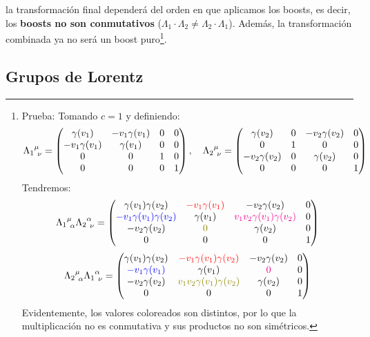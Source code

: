 \documentclass[]{article}
\numberwithin{equation}{section}
\begin{document}
la transformación final dependerá del orden en que aplicamos los boosts, es decir, los \textbf{boosts no son conmutativos} (\(\Lambda_1\cdot\Lambda_2\neq\Lambda_2\cdot\Lambda_1\)). Además, la transformación combinada ya no será un boost puro\footnote{Prueba: Tomando \(c=1\) y definiendo: \[\indUpDown[\Lambda_1] = \begin{pmatrix}
	\gamma(v_1) & -v_1\gamma(v_1) & 0 & 0\\
	-v_1\gamma(v_1) & \gamma(v_1) & 0 & 0\\
	0 & 0 & 1 & 0\\
	0 & 0 & 0 & 1
\end{pmatrix},\ \ \ \indUpDown[\Lambda_2] = \begin{pmatrix}
\gamma(v_2) & 0 & -v_2\gamma(v_2) & 0\\
0 & 1 & 0 & 0\\
-v_2\gamma(v_2) & 0 & \gamma(v_2) & 0\\
0 & 0 & 0 & 1
\end{pmatrix}\] Tendremos: \[\indUpDown[\Lambda_1][\mu][\alpha]\indUpDown[\Lambda_2][\alpha]= \begin{pmatrix}
\gamma(v_1)\gamma(v_2) & \textcolor{red}{-v_1\gamma(v_1)} & -v_2\gamma(v_2) & 0\\
\textcolor{blue}{-v_1\gamma(v_1)\gamma(v_2)} & \gamma(v_1) & \textcolor{magenta}{v_1v_2\gamma(v_1)\gamma(v_2)} & 0\\
-v_2\gamma(v_2) & \textcolor{olive}{0} & \gamma(v_2) & 0\\
0 & 0 & 0 & 1
\end{pmatrix}\]\[\indUpDown[\Lambda_2][\mu][\alpha]\indUpDown[\Lambda_1][\alpha]= \begin{pmatrix}
\gamma(v_1)\gamma(v_2) & \textcolor{red}{-v_1\gamma(v_1)\gamma(v_2)} & -v_2\gamma(v_2) & 0\\
\textcolor{blue}{-v_1\gamma(v_1)} & \gamma(v_1) & \textcolor{magenta}{0} & 0\\
-v_2\gamma(v_2) & \textcolor{olive}{v_1v_2\gamma(v_1)\gamma(v_2)} & \gamma(v_2) & 0\\
0 & 0 & 0 & 1
\end{pmatrix}\] Evidentemente, los valores coloreados son distintos, por lo que la multiplicación no es conmutativa y sus productos no son simétricos.}.

\subsection{Grupos de Lorentz}
\end{document}
